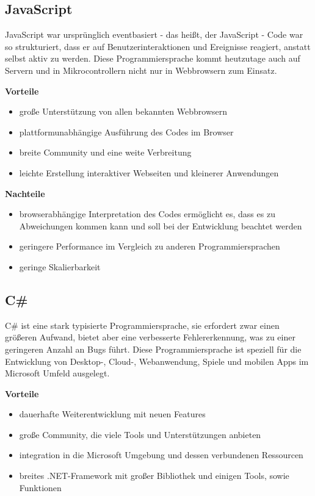 \subsection{JavaScript}
JavaScript war ursprünglich eventbasiert - das heißt, der JavaScript - Code war so strukturiert, dass er auf Benutzerinteraktionen und Ereignisse reagiert, anstatt selbst aktiv zu werden. Diese Programmiersprache kommt heutzutage auch auf Servern und in Mikrocontrollern nicht nur in Webbrowsern zum Einsatz. \textcite{Programmiersprachen}

\textbf{Vorteile}
\begin{itemize}
	\item große Unterstützung von allen bekannten Webbrowsern
	\item plattformunabhängige Ausführung des Codes im Browser
	\item breite Community und eine weite Verbreitung
	\item leichte Erstellung interaktiver Webseiten und kleinerer Anwendungen
\end{itemize}

\textbf{Nachteile}
\begin{itemize}
	\item browserabhängige Interpretation des Codes ermöglicht es, dass es zu Abweichungen kommen kann und soll bei der Entwicklung beachtet werden
	\item geringere Performance im Vergleich zu anderen Programmiersprachen
	\item geringe Skalierbarkeit
\end{itemize}

\subsection{C\#}
C\# ist eine stark typisierte Programmiersprache, sie erfordert zwar einen größeren Aufwand, bietet aber eine verbesserte Fehlererkennung, was zu einer geringeren Anzahl an Bugs führt. Diese Programmiersprache ist speziell für die Entwicklung von Desktop-, Cloud-, Webanwendung, Spiele und mobilen Apps im Microsoft Umfeld ausgelegt. \textcite{Programmiersprachen}

\textbf{Vorteile}
\begin{itemize}
	\item dauerhafte Weiterentwicklung mit neuen Features
	\item große Community, die viele Tools und Unterstützungen anbieten
	\item integration in die Microsoft Umgebung und dessen verbundenen Ressourcen
	\item breites .NET-Framework mit großer Bibliothek und einigen Tools, sowie Funktionen
\end{itemize}

